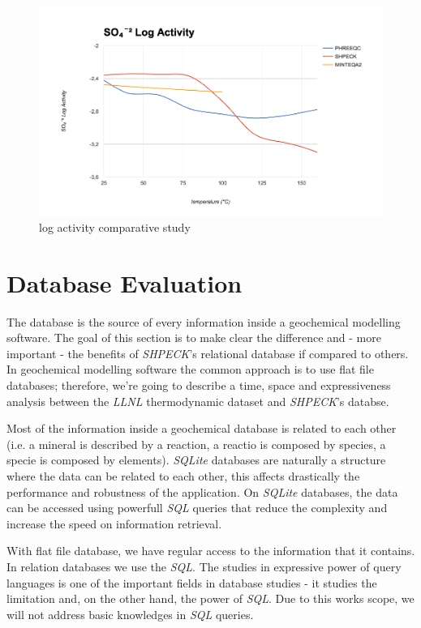 \begin{figure}[ht!]
\centering
\includegraphics[width=140mm]{figures/so4-2.png}
\caption{ log activity comparative study}
\label{fig:so4-2}
\end{figure}


\section{Database Evaluation}
The database is the source of every information inside a geochemical modelling software. The goal of this section is to make clear the difference and - more important - the benefits of \emph{SHPECK}'s relational database if compared to others. In geochemical modelling software the common approach is to use flat file databases; therefore, we're going to describe a time, space and expressiveness analysis between the \emph{LLNL} thermodynamic dataset and \emph{SHPECK}'s databse. 

Most of the information inside a geochemical database is related to each other (i.e. a mineral is described by a reaction, a reactio is composed by species, a specie is composed by elements). \emph{SQLite} databases are naturally a structure where the data can be related to each other, this affects drastically the performance and robustness of the application. On \emph{SQLite} databases, the data can be accessed using powerfull \emph{SQL} queries that reduce the complexity and increase the speed on information retrieval.

With flat file database, we have regular access to the information that it contains. In relation databases we use the \emph{SQL}. The studies in expressive power of query languages is one of the important fields in database studies - it studies the limitation and, on the other hand, the power of \emph{SQL}. Due to this works scope, we will not address basic knowledges in \emph{SQL} queries.

